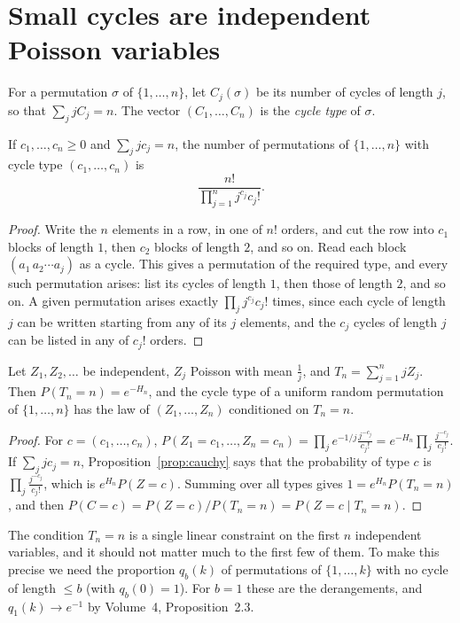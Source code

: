 \section{Small cycles are independent Poisson variables}

For a permutation $\sigma$ of $\{1,\dots,n\}$, let $C_j(\sigma)$ be its number of cycles of length $j$, so that $\sum_jjC_j=n$. The vector $(C_1,\dots,C_n)$ is the \emph{cycle type} of $\sigma$.

\begin{proposition}\label{prop:cauchy}
If $c_1,\dots,c_n\ge0$ and $\sum_jjc_j=n$, the number of permutations of $\{1,\dots,n\}$ with cycle type $(c_1,\dots,c_n)$ is
\[
\frac{n!}{\prod_{j=1}^nj^{c_j}c_j!}.
\]
\end{proposition}
\begin{proof}
Write the $n$ elements in a row, in one of $n!$ orders, and cut the row into $c_1$ blocks of length $1$, then $c_2$ blocks of length $2$, and so on. Read each block $(a_1\,a_2\cdots a_j)$ as a cycle. This gives a permutation of the required type, and every such permutation
arises: list its cycles of length $1$, then those of length $2$, and so on. A given permutation arises exactly $\prod_jj^{c_j}c_j!$ times, since each cycle of length $j$ can be written starting from any of its $j$ elements, and the $c_j$ cycles of length $j$ can be listed in any of $c_j!$ orders.
\end{proof}

\begin{theorem}\label{thm:conditioning}
Let $Z_1,Z_2,\dots$ be independent, $Z_j$ Poisson with mean $\frac1j$, and $T_n=\sum_{j=1}^njZ_j$. Then $P(T_n=n)=e^{-H_n}$, and the cycle type of a uniform random permutation of $\{1,\dots,n\}$ has the law of $(Z_1,\dots,Z_n)$ conditioned on $T_n=n$.
\end{theorem}
\begin{proof}
For $c=(c_1,\dots,c_n)$, $P(Z_1=c_1,\dots,Z_n=c_n)=\prod_je^{-1/j}\frac{j^{-c_j}}{c_j!}=e^{-H_n}\prod_j\frac{j^{-c_j}}{c_j!}$. If $\sum_jjc_j=n$, Proposition~\ref{prop:cauchy} says that the probability of type $c$ is $\prod_j\frac{j^{-c_j}}{c_j!}$, which is $e^{H_n}P(Z=c)$.
Summing over all types gives $1=e^{H_n}P(T_n=n)$, and then $P(C=c)=P(Z=c)/P(T_n=n)=P(Z=c\mid T_n=n)$.
\end{proof}

The condition $T_n=n$ is a single linear constraint on the first $n$ independent variables, and it should not matter much to the first few of them. To make this precise we need the proportion $q_b(k)$ of permutations of $\{1,\dots,k\}$ with no cycle of length $\le b$
(with $q_b(0)=1$). For $b=1$ these are the derangements, and $q_1(k)\to e^{-1}$ by Volume~4, Proposition~2.3.


